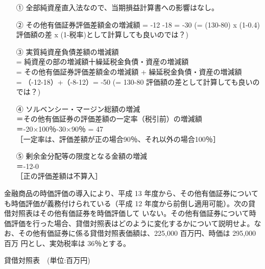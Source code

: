 \documentclass[report,gutter=10mm,fore-edge=10mm,uplatex,dvipdfmx]{jlreq}
\begin{document}
\begin{enumerate}
   \item [①] 全部純資産直入法なので、当期損益計算書への影響はなし。
 \item [②] その他有価証券評価差額金の増減額 = -12 -18 = -30
(= (130-80) x (1-0.4)  評価額の差 x (1-税率)として計算しても良いのでは？)
 \item [③] 実質純資産負債差額の増減額\\
= 純資産の部の増減額十繰延税金負債・資産の増減額\\
= その他有価証券評価差額金の増減額 + 繰延税金負債・資産の増減額\\
= （-12-18）+（-8-12）= -50
(= 130-80  評価額の差として計算しても良いのでは？)
 \item [④] ソルベンシー・マージン総額の増減\\
＝その他有価証券の評価差額の一定率（税引前）の増減額
＝-20×100％-30×90％  = 47  \\
［一定率は、評価差額が正の場合90％、それ以外の場合100％］
 \item [⑤] 剰余金分配等の限度となる金額の増減\\
＝-12-0\\
［正の評価差額は不算入］
 \end{enumerate}


金融商品の時価評価の導入により、平成 13
年度から、その他有価証券についても時価評価が義務付けられている（平成 12
年度から前倒し適用可能）。次の貸借対照表はその他有価証券を時価評価して
いない。その他有価証券について時価評価を行った場合、貸借対照表はどのように変化するかについて説明せよ。なお、その他有価証券に係る貸借対照表価額は、225,000
百万円、時価は 295,000 百万 円とし、実効税率は 36％とする。

貸借対照表   \,\, (単位:百万円)
\end{document}
